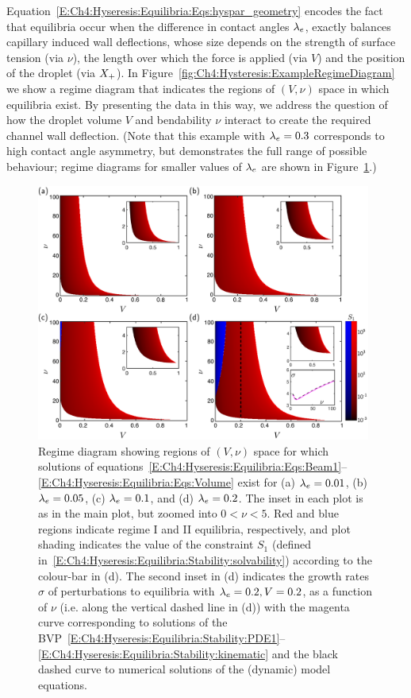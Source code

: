 Equation~\eqref{E:Ch4:Hyseresis:Equilibria:Eqs:hyspar_geometry} encodes the fact that equilibria occur when the difference in contact angles $\lambda_e$, exactly balances capillary induced wall deflections, whose size depends on the strength of surface tension (via $\nu$), the length over which the force is applied (via $V$) and the position of the droplet (via $X_{+}$). In Figure~\ref{fig:Ch4:Hysteresis:ExampleRegimeDiagram} we show a regime diagram that indicates the regions of $(V, \nu)$ space in which equilibria exist. By presenting the data in this way, we address the question of how the droplet volume $V$ and bendability $\nu$ interact to create the required channel wall deflection. (Note that this example  with $\lambda_e = 0.3$ corresponds to high contact angle asymmetry, but demonstrates the full range of possible behaviour; regime diagrams for smaller values of $\lambda_e$ are shown in Figure~\ref{fig:Ch4:Hysteresis:RegimeDiagrams}.)

\begin{figure}[h!]
\centering
\includegraphics[width = 0.98\textwidth]{example_regime_diagrams}
\caption{Regime diagram showing regions of $(V, \nu)$ space for which solutions of equations~\eqref{E:Ch4:Hyseresis:Equilibria:Eqs:Beam1}--\eqref{E:Ch4:Hyseresis:Equilibria:Eqs:Volume}  exist for (a) $\lambda_e = 0.01$, (b) $\lambda_e = 0.05$, (c) $\lambda_e = 0.1$, and (d) $\lambda_e = 0.2$. The inset in each plot is as in the main plot, but zoomed into $0 < \nu < 5$. Red and blue regions indicate regime I  and II equilibria, respectively, and plot shading indicates the value of the constraint $S_1$ (defined in~\eqref{E:Ch4:Hyseresis:Equilibria:Stability:solvability}) according to the colour-bar in (d). The second inset in (d) indicates the growth rates $\sigma$ of perturbations to equilibria with $\lambda_e = 0.2, V = 0.2$, as a function of $\nu$ (i.e. along the vertical dashed line in (d)) with the magenta curve corresponding to solutions of the BVP~\eqref{E:Ch4:Hyseresis:Equilibria:Stability:PDE1}--\eqref{E:Ch4:Hyseresis:Equilibria:Stability:kinematic} and the black dashed curve to numerical solutions of the (dynamic) model equations.}\label{fig:Ch4:Hysteresis:RegimeDiagrams}
\end{figure}

